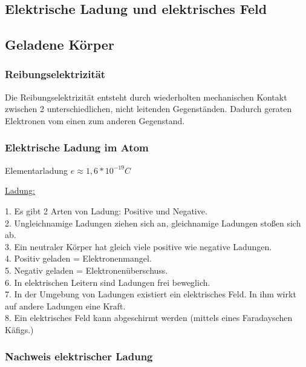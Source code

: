 \documentclass[12pt]{scrartcl}
\author{Patrick Müller}
\author{Josua Kugler}
\begin{document}
\begin{flushleft}
	\tableofcontents
	\section{Elektrische Ladung und elektrisches Feld}
		\subsection{Geladene Körper}
			\subsubsection{Reibungselektrizität}
			Die Reibungselektrizität entsteht durch wiederholten mechanischen Kontakt zwischen 2 unterschiedlichen, nicht leitenden Gegenständen. Dadurch geraten Elektronen vom einen zum anderen Gegenstand.
	
			\subsubsection{Elektrische Ladung im Atom}

			Elementarladung $ e \approx 1,6 \ast 10^{-19}C $
	
	
			\vspace{3mm}
			\underline{Ladung:}
	
			\vspace{2mm}
			1. Es gibt 2 Arten von Ladung: Positive und Negative. \\
			2. Ungleichnamige Ladungen ziehen sich an, gleichnamige Ladungen stoßen sich ab. \\
			3. Ein neutraler Körper hat gleich viele positive wie negative Ladungen. \\
			4. Positiv geladen = Elektronenmangel. \\
			5. Negativ geladen = Elektronenüberschuss. \\
			6. In elektrischen Leitern sind Ladungen frei beweglich. \\
			7. In der Umgebung von Ladungen existiert ein elektrisches Feld. In ihm wirkt auf andere Ladungen eine Kraft. \\
			8. Ein elektrisches Feld kann abgeschirmt werden (mittels eines Faradayschen Käfigs.) \\
	
			\subsubsection{Nachweis elektrischer Ladung}
	

\end{flushleft}
\end{document}
